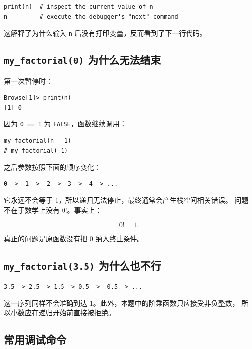 \documentclass[11pt,a4paper]{ctexart}
\begin{document}
\begin{lstlisting}[style=rcode]
print(n)  # inspect the current value of n
n         # execute the debugger's "next" command
\end{lstlisting}

这解释了为什么输入 \lstinline|n| 后没有打印变量，反而看到了下一行代码。

\subsection{\texttt{my\_factorial(0)} 为什么无法结束}

第一次暂停时：

\begin{lstlisting}[style=textcode]
Browse[1]> print(n)
[1] 0
\end{lstlisting}

因为 \lstinline|0 == 1| 为 \lstinline|FALSE|，函数继续调用：

\begin{lstlisting}[style=rcode]
my_factorial(n - 1)
# my_factorial(-1)
\end{lstlisting}

之后参数按照下面的顺序变化：

\begin{lstlisting}[style=textcode]
0 -> -1 -> -2 -> -3 -> -4 -> ...
\end{lstlisting}

它永远不会等于 1，所以递归无法停止，最终通常会产生栈空间相关错误。
问题不在于数学上没有 \(0!\)。事实上：

\[
0! = 1.
\]

真正的问题是原函数没有把 0 纳入终止条件。

\subsection{\texttt{my\_factorial(3.5)} 为什么也不行}

\begin{lstlisting}[style=textcode]
3.5 -> 2.5 -> 1.5 -> 0.5 -> -0.5 -> ...
\end{lstlisting}

这一序列同样不会准确到达 1。此外，本题中的阶乘函数只应接受非负整数，
所以小数应在递归开始前直接被拒绝。

\subsection{常用调试命令}
\end{document}
